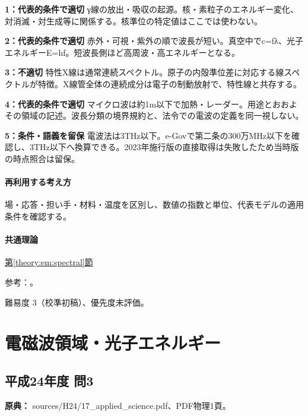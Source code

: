 \noindent\textbf{1：代表的条件で適切} γ線の放出・吸収の起源。核・素粒子のエネルギー変化、対消滅・対生成等に関係する。核準位の特定値はここでは使わない。\par

\noindent\textbf{2：代表的条件で適切} 赤外・可視・紫外の順で波長が短い。真空中でc=\allowbreak{}fλ、光子エネルギーE=\allowbreak{}hf。短波長側ほど高周波・高エネルギーとなる。\par

\noindent\textbf{3：不適切} 特性X線は通常連続スペクトル。原子の内殻準位差に対応する線スペクトルが特徴。X線管全体の連続成分は電子の制動放射で、特性線と共存する。\par

\noindent\textbf{4：代表的条件で適切} マイクロ波は約1m以下で加熱・レーダー。用途とおおよその領域の記述。波長分類の境界規約と、法令での電波の定義を同一視しない。\par

\noindent\textbf{5：条件・語義を留保} 電波法は3THz以下。e-Govで第二条の300万MHz以下を確認し、3THz以下へ換算できる。2023年施行版の直接取得は失敗したため当時版の時点照合は留保。\par

\paragraph{再利用する考え方} 場・応答・担い手・材料・温度を区別し、数値の指数と単位、代表モデルの適用条件を確認する。

\paragraph{共通理論} \hyperref[theory:em:spectral]{第\ref*{theory:em:spectral}節}

\par 参考：\cite{em51_xray,em51_radio_law}。

\par 難易度 3（校準初稿）、優先度未評価。

\section{電磁波領域・光子エネルギー}

\subsection{平成24年度 問3}
\label{q:h24-reg-applied-03}

\noindent\textbf{原典：} sources/H24/17\_applied\_science.pdf、PDF物理1頁。

